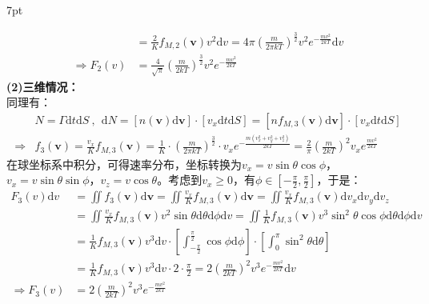 \documentclass[zihao=5,UTF8]{report}
\newenvironment{graybox}{%
\def\FrameCommand{%
\hspace{1pt}%
{\color{gray}\small \vrule width 2pt}%
{\color{graybox_color}\vrule width 4pt}%
\colorbox{graybox_color}%
}%
\MakeFramed{\advance\hsize-\width\FrameRestore}%
\noindent\hspace{-4.55pt}%
\begin{adjustwidth}{}{7pt}%
\vspace{2pt}\vspace{2pt}%
}
{%
\vspace{2pt}\end{adjustwidth}\endMakeFramed%
}
\begin{document}
\begin{graybox}
\begin{align*}
     &= \frac{2}{K}f_{M,2}(\boldsymbol{v}) v^2 \mathrm{d}v  = 4\pi \left( \frac{m}{2\pi kT}\right)^{\frac{3}{2}}v^2e^{-\frac{mv^2}{2kT}} \mathrm{d}v \\
    \Longrightarrow
    F_2(v) & = \frac{4}{\sqrt{\pi}}\left(\frac{m}{2kT} \right)^{\frac{3}{2}}v^2e^{-\frac{mv^2}{2kT}} 
\end{align*}
\textbf{(2)三维情况：}\\
同理有：
\begin{align*}
&N = \Gamma\mathrm{d}t\mathrm{d}S \ ,\ \ \mathrm{d}N = [n(\boldsymbol{v})\mathrm{d}\boldsymbol{v}]\cdot [v_x\mathrm{d}t\mathrm{d}S] = \left[ nf_{M,3}(\boldsymbol{v})\mathrm{d}\boldsymbol{v}  \right]\cdot \left[ v_x \mathrm{d}t\mathrm{d}S \right]\\
\Longrightarrow & f_3(\boldsymbol{v}) = \frac{v_x}{K}f_{M,3}(\boldsymbol{v}) = \frac{1}{K}\cdot \left(\frac{m}{2\pi kT} \right)^{\frac{3}{2}}\cdot v_xe^{-\frac{m(v_x^2 + v_y^2 + v_z^2)}{2kT}}
 = \frac{2}{\pi} \left( \frac{m}{2kT}\right)^2 v_x e^{\frac{mv^2}{2kT}}\end{align*}
在球坐标系中积分，可得速率分布，坐标转换为$v_x = v \sin\theta \cos \phi$，$v_x = v \sin\theta \sin \phi$，$v_z = v\cos \theta$。考虑到$v_x \ge 0 $，有$\phi \in [-\frac{\pi}{2}, \frac{\pi}{2}]$，于是：
\begin{align*}
    F_3(v)\mathrm{d}v 
    &=  \iint f_3(\boldsymbol{v}) \mathrm{d}\boldsymbol{v} 
    = \iint \frac{v_x}{K}f_{M,3}(\boldsymbol{v}) \mathrm{d}\boldsymbol{v}  
    = \iint \frac{v_x}{K}f_{M,3}(\boldsymbol{v}) \mathrm{d}v_x\mathrm{d}v_y\mathrm{d}v_z\\
    & = \iint \frac{v_x}{K}f_{M,3}(\boldsymbol{v})v^2 \sin \theta \mathrm{d}\theta \mathrm{d}\phi \mathrm{d}v  
    = \iint \frac{1}{K}f_{M,3}(\boldsymbol{v}) v^3 \sin^2 \theta \cos \phi \mathrm{d}\theta \mathrm{d}\phi \mathrm{d}v  \\
    &= \frac{1}{K} f_{M,3}(\boldsymbol{v})v^3\mathrm{d}v \cdot \left[ \int_{-\frac{\pi}{2}}^{\frac{\pi}{2}} \cos \phi \mathrm{d}\phi\right] \cdot \left[\int_{0}^{\pi}\sin^2 \theta  \mathrm{d} \theta\right] \\
    &= \frac{1}{K} f_{M,3}(\boldsymbol{v})v^3\mathrm{d}v \cdot 2 \cdot \frac{\pi}{2}  = 2 \left(\frac{m}{2kT} \right)^2 v^3 e^{-\frac{mv^2}{2kT}} \mathrm{d}v\\
    \Longrightarrow  F_3(v) &= 2 \left(\frac{m}{2kT} \right)^2 v^3 e^{-\frac{mv^2}{2kT}} 
\end{align*}\noindent
\end{graybox}
\end{document}
